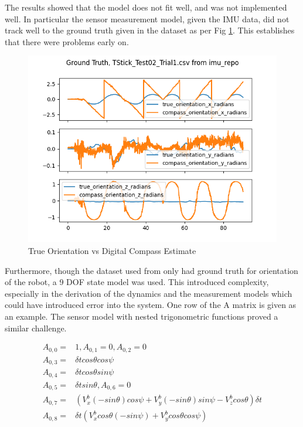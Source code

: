 \documentclass[conference]{IEEEtran}
\begin{document}
The results showed that the model does not fit well, and was not implemented well. In particular the sensor measurement model, given the IMU data, did not track well to the ground truth given in the dataset as per Fig \ref{fig:true_orientation}.  This establishes that there were problems early on.
\begin{figure}[h!]
  \includegraphics[width=\columnwidth]{true_values_vs_measurements.png}
  \caption{True Orientation vs Digital Compass Estimate}
  \label{fig:true_orientation}
\end{figure}

Furthermore, though the dataset used from \cite{b20} only had ground truth for orientation of the robot, a 9 DOF state model was used. This introduced complexity, especially in the derivation of the dynamics and the measurement models which could have introduced error into the system.  One row of the A matrix is given as an example. The sensor model with nested trigonometric functions proved a similar challenge.

\begin{align*}
A_{0,0} =& 1, A_{0,1} = 0, A_{0,2} = 0\\
A_{0,3} =& \delta t cos \theta cos \psi \\
A_{0,4} =& \delta t cos \theta sin \psi \\
A_{0,5} =&  \delta t sin \theta, A_{0,6} =  0 \\
A_{0,7} =& (V_x^b (-sin \theta) cos \psi + V_y^b (-sin \theta) sin \psi - V_z^b cos \theta) \delta t \\
A_{0,8} =& \delta t (V_x^b cos \theta (-sin \psi ) + V_y^b cos \theta cos \psi)\\
\end{align*}
\end{document}
